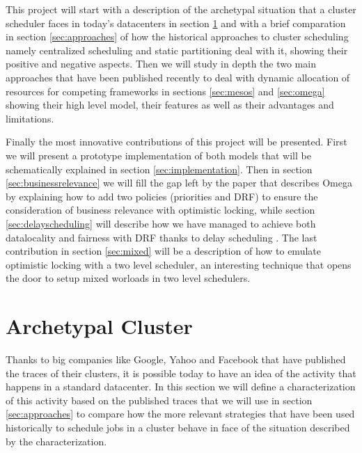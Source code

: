 \documentclass{report}                     %
\begin{document}

This project will start with a description of the archetypal situation
that a cluster scheduler faces in today's datacenters in section
\ref{sec:archetype} and with a brief comparation in section
\ref{sec:approaches} of how the historical approaches to cluster
scheduling namely centralized scheduling and static partitioning deal
with it, showing their positive and negative aspects. Then we will
study in depth the two main approaches that have been published
recently to deal with dynamic allocation of resources for competing
frameworks in sections \ref{sec:mesos} and \ref{sec:omega} showing
their high level model, their features as well as their advantages and
limitations. 

Finally the most innovative contributions of this project will be
presented. First we will present a prototype implementation of both
models that will be schematically explained in section
\ref{sec:implementation}. Then in section \ref{sec:businessrelevance}
we will fill the gap left by the paper that describes Omega by
explaining how to add two policies (priorities and DRF) to ensure the
consideration of business relevance with optimistic locking, while
section \ref{sec:delayscheduling} will describe how we have managed to
achieve both datalocality and fairness with DRF thanks to delay
scheduling \cite{zaharia_delay_2010}. The last contribution in section
\ref{sec:mixed} will be a description of how to emulate optimistic
locking with a two level scheduler, an interesting technique that
opens the door to setup mixed worloads in two level schedulers.




\chapter{Archetypal Cluster}
\label{sec:archetype}

Thanks to big companies like Google, Yahoo and Facebook that
have published the traces of their clusters, it is possible today to
have an idea of the activity that happens in a standard datacenter.
In this section we will define a characterization of this activity based on
the published traces that we will use in section \ref{sec:approaches} to 
compare how the more relevant strategies that have been used historically
to schedule jobs in a cluster behave in face of the situation described
by the characterization.
\end{document}
